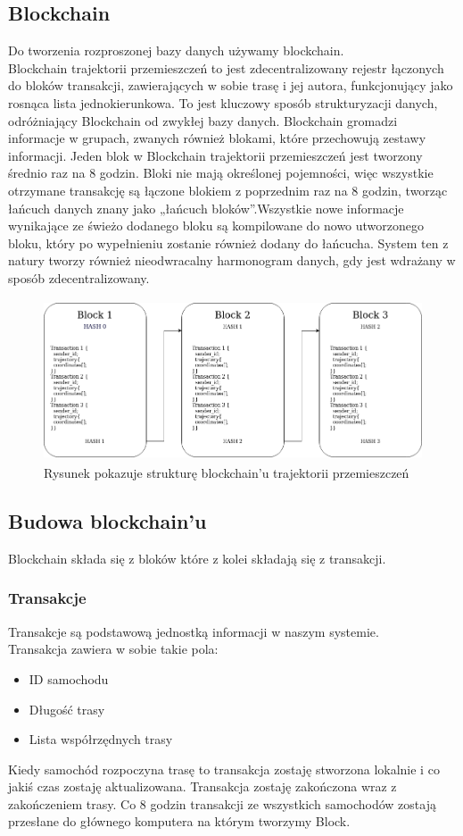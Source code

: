 \documentclass{sprawozdanie-agh}
\begin{document}
\subsection{Blockchain}
Do tworzenia rozproszonej bazy danych używamy blockchain. \\
Blockchain trajektorii przemieszczeń to jest zdecentralizowany rejestr łączonych do bloków transakcji, zawierających w sobie trasę i jej autora, funkcjonujący jako rosnąca lista jednokierunkowa. To jest kluczowy sposób strukturyzacji danych, odróżniający Blockchain od zwykłej bazy danych. Blockchain gromadzi informacje w grupach, zwanych również blokami, które przechowują zestawy informacji. Jeden blok w Blockchain trajektorii przemieszczeń jest tworzony średnio raz na 8 godzin. Bloki nie mają określonej pojemności, więc wszystkie otrzymane transakcję są łączone blokiem z poprzednim raz na 8 godzin, tworząc łańcuch danych znany jako „łańcuch bloków”.Wszystkie nowe informacje wynikające ze świeżo dodanego bloku są kompilowane do nowo utworzonego bloku, który po wypełnieniu zostanie również dodany do łańcucha. System ten z natury tworzy również nieodwracalny harmonogram danych, gdy jest wdrażany w sposób zdecentralizowany.
\begin{figure}[htbp]
    \centerline{\includegraphics[width=480px, height=180px]{blockchain.png}}
    \caption{Rysunek pokazuje strukturę blockchain'u trajektorii przemieszczeń}
    \label{fig}
\end{figure}

\subsection{Budowa blockchain'u}
Blockchain składa się z bloków które z kolei składają się z transakcji. 
\subsubsection{Transakcje}
Transakcje są podstawową jednostką informacji w naszym systemie. \\
Transakcja zawiera w sobie takie pola:
   \begin{itemize}
     \item ID samochodu
     \item Długość trasy
     \item Lista współrzędnych trasy 
   \end{itemize}
Kiedy samochód rozpoczyna trasę to transakcja zostaję stworzona lokalnie i co jakiś czas zostaję aktualizowana. Transakcja zostaję zakończona wraz z zakończeniem trasy. Co 8 godzin transakcji ze wszystkich samochodów zostają przesłane do głównego komputera na którym tworzymy Block.
\end{document}
